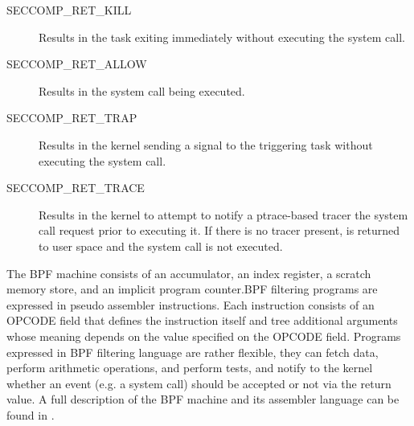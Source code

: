 \begin{description}
\item[SECCOMP\_RET\_KILL]  Results in the task exiting immediately without executing the system call. 
\item[SECCOMP\_RET\_ALLOW] Results in the system call being executed.
\item[SECCOMP\_RET\_TRAP]  Results in the kernel sending a  signal to the triggering task without executing the system call. 
\item[SECCOMP\_RET\_TRACE] Results in the kernel to attempt to notify a ptrace-based tracer the system call request prior to executing it.  If there is no tracer present,
						    is returned to user space and the system call is not executed.
\end{description}

The BPF machine consists of an accumulator, an index register, a scratch memory store, and an implicit program counter.BPF filtering programs are expressed in pseudo assembler instructions. Each instruction consists of an OPCODE field that defines the instruction itself and tree additional arguments whose meaning depends on the value specified on the OPCODE field.  Programs expressed in BPF filtering language  are rather flexible, they can fetch data, perform arithmetic operations, and perform tests, and notify to the kernel whether an event (e.g. a system call) should be accepted or not via the return value. A full description of the BPF machine and its assembler language can be found in \cite{bpf}.

